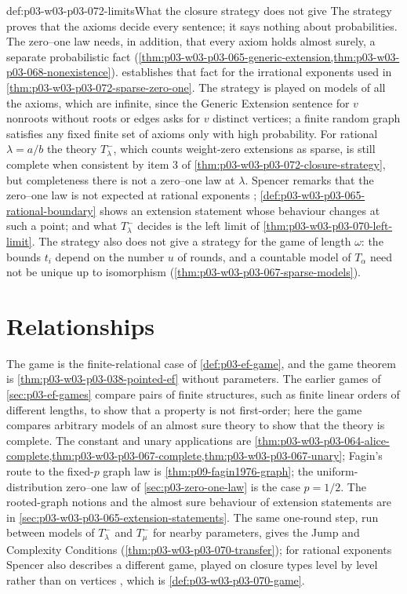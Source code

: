 \begin{hbwarning}{def:p03-w03-p03-072-limits}{What the closure strategy does not give}
The strategy proves that the axioms decide every sentence; it says nothing
about probabilities.  The zero--one law needs, in addition, that every axiom
holds almost surely, a separate probabilistic fact
(\cref{thm:p03-w03-p03-065-generic-extension,thm:p03-w03-p03-068-nonexistence}).
 establishes that fact for the irrational
exponents used in \cref{thm:p03-w03-p03-072-sparse-zero-one}.  The
strategy is played on models of all the axioms, which are infinite, since
the Generic Extension sentence for \(v\) nonroots without roots or edges
asks for \(v\) distinct vertices; a finite random graph satisfies any fixed
finite set of axioms only with high probability.  For rational \(\lambda=a/b\) the theory \(T^-_\lambda\), which
counts weight-zero extensions as sparse, is still complete when consistent
by item 3 of \cref{thm:p03-w03-p03-072-closure-strategy}, but completeness
there is not a zero--one law at \(\lambda\).  Spencer remarks that the
zero--one law is not expected at rational exponents
\cite[p.~19]{Spencer2007LogicRandomStructuresAuthor};
\cref{def:p03-w03-p03-065-rational-boundary} shows an extension statement
whose behaviour changes at such a point; and what \(T^-_\lambda\) decides is
the left limit of \cref{thm:p03-w03-p03-070-left-limit}.  The
strategy also does not give a strategy for the game of length \(\omega\):
the bounds \(t_i\) depend on the number \(u\) of rounds, and a countable
model of \(T_\alpha\) need not be unique up to isomorphism
(\cref{thm:p03-w03-p03-067-sparse-models}).
\end{hbwarning}

\section{Relationships}
\label{sec:p03-w03-p03-072-relationships}

The game is the finite-relational case of \cref{def:p03-ef-game}, and the
game theorem is \cref{thm:p03-w03-p03-038-pointed-ef} without parameters.
The earlier games of \cref{sec:p03-ef-games} compare pairs of finite
structures, such as finite linear orders of different lengths, to show that
a property is not first-order; here the game compares arbitrary models of
an almost sure theory to show that the theory is complete.  The constant
and unary applications are
\cref{thm:p03-w03-p03-064-alice-complete,thm:p03-w03-p03-067-complete,thm:p03-w03-p03-067-unary};
Fagin's route to the fixed-\(p\) graph law is \cref{thm:p09-fagin1976-graph};
the uniform-distribution zero--one law of \cref{sec:p03-zero-one-law} is
the case \(p=1/2\).  The rooted-graph notions and the almost sure behaviour
of extension statements are in \cref{sec:p03-w03-p03-065-extension-statements}.
The same one-round step, run between models of \(T^-_\lambda\) and
\(T^-_\mu\) for nearby parameters, gives the Jump and Complexity Conditions
(\cref{thm:p03-w03-p03-070-transfer}); for rational exponents Spencer also
describes a different game, played on closure types level by level rather
than on vertices \cite[pp.~20--21]{Spencer2007LogicRandomStructuresAuthor},
which is \cref{def:p03-w03-p03-070-game}.

